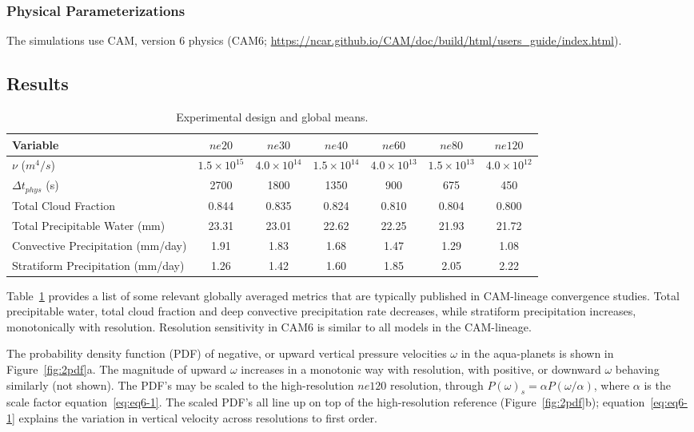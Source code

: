 \subsubsection{Physical Parameterizations}

The simulations use CAM, version 6 physics (CAM6; \url{https://ncar.github.io/CAM/doc/build/html/users_guide/index.html}).
\subsection{Results}

 \begin{table}
 \caption{Experimental design and global means.}
 \centering
 \scriptsize
 \begin{tabular}{lcccccc}
   \hline
   Variable & $ne20$ & $ne30$ & $ne40$ & $ne60$ & $ne80$ & $ne120$ \\
   \hline
   $\nu$ ($m^4/s$) & $1.5 \times 10^{15}$ & $4.0 \times 10^{14}$ & $1.5 \times 10^{14}$ & $4.0 \times 10^{13}$  & $1.5 \times 10^{13}$ & $4.0 \times 10^{12}$\\
    $\Delta t_{phys}$ (s) & 2700 & 1800 & 1350 & 900 & 675 & 450 \\
   Total Cloud Fraction & 0.844 & 0.835 & 0.824 & 0.810 & 0.804 & 0.800 \\ 
   Total Precipitable Water (mm) & 23.31& 23.01 & 22.62 & 22.25 & 21.93 & 21.72 \\
   Convective Precipitation (mm/day) & 1.91 & 1.83 & 1.68 & 1.47 & 1.29 & 1.08 \\
   Stratiform Precipitation (mm/day) & 1.26 & 1.42 & 1.60 & 1.85 & 2.05 & 2.22 \\      
 \hline
 \end{tabular}
 \label{tbl:table6-1}
 \end{table}

Table~\ref{tbl:table6-1} provides a list of some relevant globally averaged metrics that are typically published in CAM-lineage convergence studies. Total precipitable water, total cloud fraction and deep convective precipitation rate decreases, while stratiform precipitation increases, monotonically with resolution. Resolution sensitivity in CAM6 is similar to all models in the CAM-lineage. 

The probability density function (PDF) of negative, or upward vertical pressure velocities $\omega$ in the aqua-planets is shown in Figure~\ref{fig:2pdf}a. The magnitude of upward $\omega$ increases in a monotonic way with resolution, with positive, or downward $\omega$ behaving similarly (not shown). The PDF's may be scaled to the high-resolution $ne120$ resolution, through $P(\omega)_s = \alpha P (\omega / \alpha)$, where $\alpha$ is the scale factor equation~\ref{eq:eq6-1}. The scaled PDF's all line up on top of the high-resolution reference (Figure~\ref{fig:2pdf}b); equation~\ref{eq:eq6-1} explains the variation in vertical velocity across resolutions to first order. 

